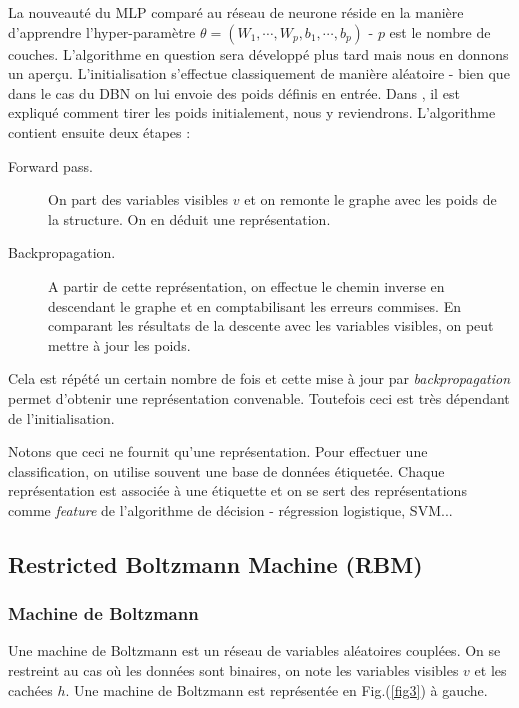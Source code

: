 \documentclass[10pt,a4paper]{article}
\begin{document}
La nouveauté du MLP comparé au réseau de neurone réside en la manière d'apprendre l'hyper-paramètre $\theta = (W_1, \cdots, W_p, b_1, \cdots, b_p)$ - $p$ est le nombre de couches. L'algorithme en question sera développé plus tard mais nous en donnons un aperçu. L'initialisation s'effectue classiquement de manière aléatoire - bien que dans le cas du DBN on lui envoie des poids définis en entrée. Dans \cite{GlorotAISTATS2010}, il est expliqué comment tirer les poids initialement, nous y reviendrons. L'algorithme contient ensuite deux étapes :
\begin{description}
\item[Forward pass. ]On part des variables visibles $v$ et on remonte le graphe avec les poids de la structure. On en déduit une représentation.

\item[Backpropagation. ]A partir de cette représentation, on effectue le chemin inverse en descendant le graphe et en comptabilisant les erreurs commises. En comparant les résultats de la descente avec les variables visibles, on peut mettre à jour les poids.
\end{description}
Cela est répété un certain nombre de fois et cette mise à jour par \emph{backpropagation} permet d'obtenir une représentation convenable. Toutefois ceci est très dépendant de l'initialisation. 

Notons que ceci ne fournit qu'une représentation. Pour effectuer une classification, on utilise souvent une base de données étiquetée. Chaque représentation est associée à une étiquette et on se sert des représentations comme \emph{feature} de l'algorithme de décision - régression logistique, SVM...



\subsection{Restricted Boltzmann Machine (RBM)}

\subsubsection{Machine de Boltzmann}

Une machine de Boltzmann est un réseau de variables aléatoires couplées. On se restreint au cas où les données sont binaires, on note les variables visibles $v$ et les cachées $h$. Une machine de Boltzmann est représentée en Fig.(\ref{fig3}) à gauche.
\end{document}
